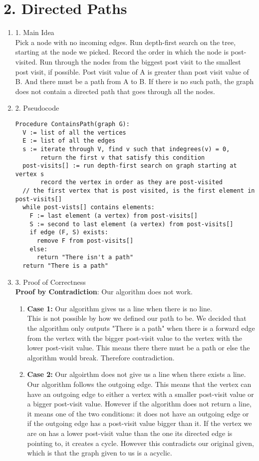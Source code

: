 \documentclass[11pt]{article}
\newenvironment{qparts}{\begin{enumerate}[{(}a{)}]}{\end{enumerate}}
\begin{document}
\newpage
\section*{2. Directed Paths}
\begin{qparts}
\item[1.] Main Idea \\
Pick a node with no incoming edges. Run depth-first search on the tree, starting at the node we picked. Record the order in which the node is post-visited. Run through the nodes from the biggest post visit to the smallest post visit, if possible. Post visit value of A is greater than post visit value of B. And there must be a path from A to B. If there is no such path, the graph does not contain a directed path that goes through all the nodes. 
\item[2.] Pseudocode 
\begin{verbatim}
Procedure ContainsPath(graph G): 
  V := list of all the vertices
  E := list of all the edges
  s := iterate through V, find v such that indegrees(v) = 0,
       return the first v that satisfy this condition
  post-visits[] := run depth-first search on graph starting at vertex s
       record the vertex in order as they are post-visited
  // the first vertex that is post visited, is the first element in post-visits[]
  while post-vists[] contains elements:
    F := last element (a vertex) from post-visits[]
    S := second to last element (a vertex) from post-visits[]
    if edge (F, S) exists:
      remove F from post-visits[]
    else:
      return "There isn't a path"
  return "There is a path"      
\end{verbatim}
\item[3.] Proof of Correctness \\
\textbf{Proof by Contradiction}: Our algorithm does not work.
\begin{qparts}
\item[] \textbf{Case 1:} Our algorithm gives us a line when there is no line. \\
This is not possible by how we defined our path to be. We decided that the algorithm only outputs "There is a path" when there is a forward edge from the vertex with the bigger post-visit value to the vertex with the lower post-visit value. This means there there must be a path or else the algorithm would break. Therefore contradiction. \\

\item[] \textbf{Case 2:} Our algoirthm does not give us a line when there exists a line. \\
Our algorithm follows the outgoing edge. This means that the vertex can have an outgoing edge to either a vertex with a smaller post-visit value or a bigger post-visit value. However if the algorithm does not return a line, it means one of the two conditions: it does not have an outgoing edge or if the outgoing edge has a post-visit value bigger than it. If the vertex we are on has a lower post-visit value than the one its directed edge is pointing to, it creates a cycle. However this contradicts our original given, which is that the graph given to us is a acyclic. 
\end{qparts}


\end{qparts}
\end{document}
